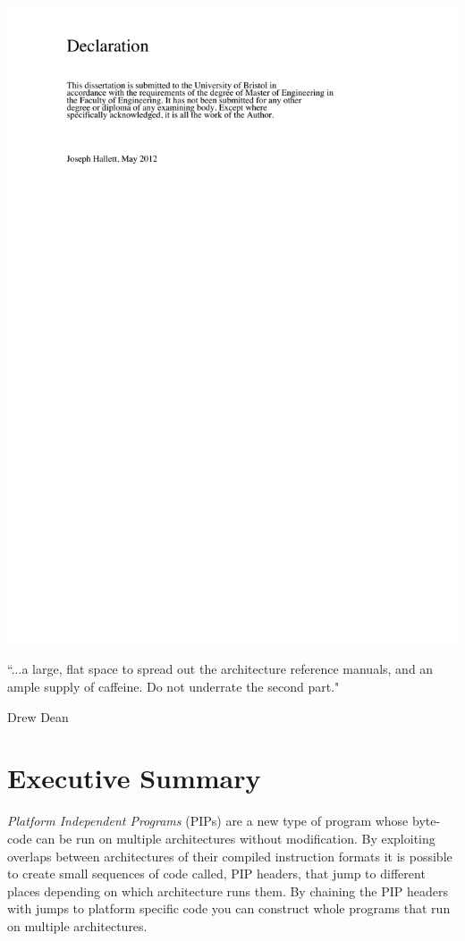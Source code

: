 \documentclass[10pt,]{book}
\begin{document}
\includegraphics[width=\linewidth]{Declaration.pdf}


\maketitle

\epigraph{\textsf{``{.}{.}{.}a large, flat space to spread out the architecture reference manuals, and an ample supply of caffeine. Do not underrate the second part."}}{\textsf{Drew Dean}}

\tableofcontents
\listoftables
\lstlistoflistings
\chapter{Executive Summary}

\emph{Platform Independent Programs} (PIPs) are a new type of program
whose byte-code can be run on multiple architectures without
modification. By exploiting overlaps between architectures of their
compiled instruction formats it is possible to create small sequences of
code called, PIP headers, that jump to different places depending on
which architecture runs them. By chaining the PIP headers with jumps to
platform specific code you can construct whole programs that run on
multiple architectures.
\end{document}
